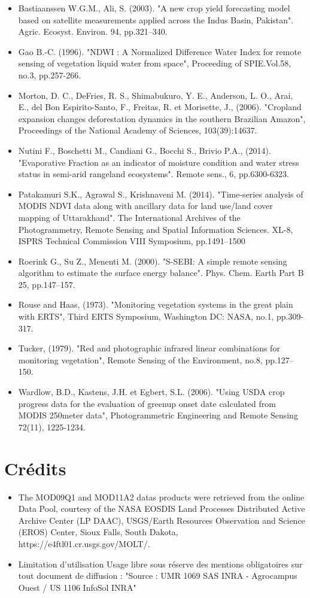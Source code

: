 \documentclass[10pt,a4paper]{article}
\begin{document}
\begin{itemize}
\item Bastiaanssen W.G.M., Ali, S. (2003). "A new crop yield forecasting model based on satellite measurements applied across the Indus Basin, Pakistan". Agric. Ecosyst. Environ. 94, pp.321–340.
\item Gao B.-C. (1996). "NDWI : A  Normalized  Difference  Water  Index  for  remote  sensing  of vegetation liquid water from space", Proceeding of SPIE.Vol.58, no.3, pp.257-266.
\item Morton, D. C., DeFries, R. S., Shimabukuro, Y. E., Anderson, L. O., Arai, E., del Bon Espirito-Santo, F.,  Freitas,  R.  et  Morisette,  J.,  (2006). "Cropland expansion changes deforestation dynamics in the southern Brazilian Amazon", Proceedings of the National Academy of Sciences, 103(39):14637. 
\item Nutini F., Boschetti M., Candiani G., Bocchi S., Brivio P.A., (2014). "Evaporative Fraction as an indicator of moisture condition and water stress status in semi-arid rangeland ecosystems". Remote sens., 6, pp.6300-6323.
\item Patakamuri S.K., Agrawal S., Krishnaveni M. (2014). "Time-series analysis of MODIS NDVI data along with ancillary data for land use/land cover mapping of Uttarakhand". The International Archives of the Photogrammetry, Remote Sensing and Spatial Information Sciences. XL-8, ISPRS Technical Commission VIII Symposium, pp.1491–1500
\item Roerink G., Su Z., Menenti M. (2000). "S-SEBI: A simple remote sensing algorithm to estimate the surface energy balance". Phys. Chem. Earth Part B 25, pp.147–157.
\item Rouse and Haas, (1973). "Monitoring vegetation systems in the great plain with ERTS", Third ERTS Symposium, Washington DC: NASA, no.1, pp.309-317.
\item Tucker, (1979). "Red and photographic infrared linear combinations for monitoring vegetation", Remote Sensing of the Environment, no.8, pp.127–150. 
\item Wardlow, B.D., Kastens, J.H. et Egbert, S.L. (2006). "Using USDA crop progress data for the evaluation of greenup onset date calculated from MODIS 250meter data", Photogrammetric Engineering and Remote Sensing 72(11), 1225-1234. 
\end{itemize}

\section{Crédits}
\begin{itemize}
\item The MOD09Q1 and MOD11A2 datas products were retrieved from the online Data Pool, courtesy of the NASA EOSDIS Land Processes Distributed Active Archive Center (LP DAAC), USGS/Earth Resources Observation and Science (EROS) Center, Sioux Falls, South Dakota, https://e4ftl01.cr.usgs.gov/MOLT/. 
\item Limitation d'utilisation
Usage libre sous réserve des mentions obligatoires sur tout document de diffusion : "Source : UMR 1069 SAS INRA - Agrocampus Ouest / US 1106 InfoSol INRA" 
\end{itemize}
\end{document}
